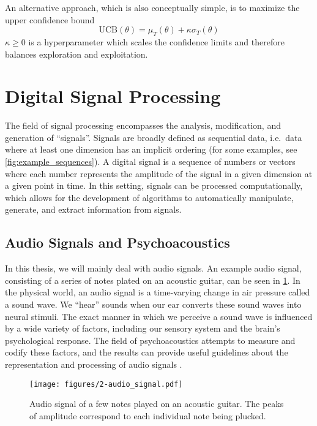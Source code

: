 An alternative approach, which is also conceptually simple, is to maximize the upper confidence bound
\begin{equation}
        \mathrm{UCB}(\theta) = \mu_T(\theta) + \kappa \sigma_T(\theta)
\end{equation}
$\kappa \ge 0$ is a hyperparameter which scales the confidence limits and therefore balances exploration and exploitation.

\section{Digital Signal Processing}

The field of signal processing encompasses the analysis, modification, and generation of ``signals''.
Signals are broadly defined as sequential data, i.e.\ data where at least one dimension has an implicit ordering (for some examples, see \cref{fig:example_sequences}).
A digital signal is a sequence of numbers or vectors where each number represents the amplitude of the signal in a given dimension at a given point in time.
In this setting, signals can be processed computationally, which allows for the development of algorithms to automatically manipulate, generate, and extract information from signals.

\subsection{Audio Signals and Psychoacoustics}
\label{sec:psychoacoustics}

In this thesis, we will mainly deal with audio signals.
An example audio signal, consisting of a series of notes plated on an acoustic guitar, can be seen in \cref{fig:audio_signal}.
In the physical world, an audio signal is a time-varying change in air pressure called a sound wave.
We ``hear'' sounds when our ear converts these sound waves into neural stimuli.
The exact manner in which we perceive a sound wave is influenced by a wide variety of factors, including our sensory system and the brain's psychological response.
The field of psychoacoustics attempts to measure and codify these factors, and the results can provide useful guidelines about the representation and processing of audio signals \cite{}.

\begin{figure}
  \centering
  \texttt{[image: figures/2-audio\_signal.pdf]}
  \caption[Audio recording of an acoustic guitar]{Audio signal of a few notes played on an acoustic guitar.
  The peaks of amplitude correspond to each individual note being plucked.}
  \label{fig:audio_signal}
\end{figure}

